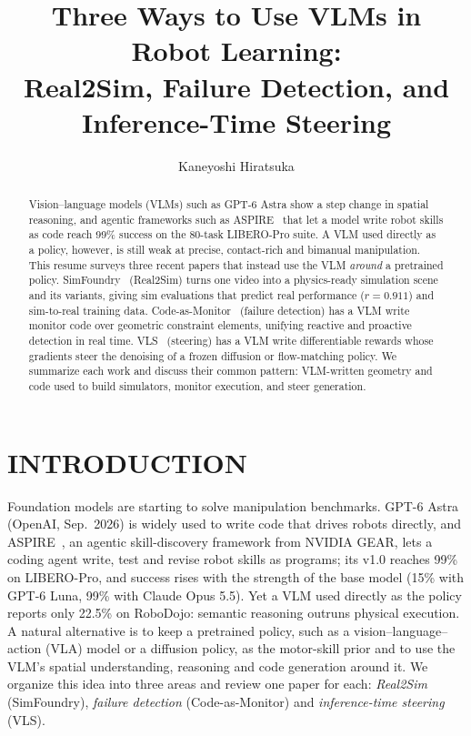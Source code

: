 \documentclass[letterpaper, 10 pt, conference]{ieeeconf}
\title{\LARGE \bf
Three Ways to Use VLMs in Robot Learning:\\
Real2Sim, Failure Detection, and Inference-Time Steering
}
\author{Kaneyoshi Hiratsuka}
\begin{document}
\maketitle
\thispagestyle{empty}
\pagestyle{empty}

\begin{abstract}
Vision--language models (VLMs) such as GPT-6 Astra show a step change in spatial reasoning, and agentic frameworks such as ASPIRE~\cite{lu2026aspire} that let a model write robot skills as code reach 99\% success on the 80-task LIBERO-Pro suite. A VLM used directly as a policy, however, is still weak at precise, contact-rich and bimanual manipulation. This resume surveys three recent papers that instead use the VLM \emph{around} a pretrained policy. SimFoundry~\cite{ranawaka2026simfoundry} (Real2Sim) turns one video into a physics-ready simulation scene and its variants, giving sim evaluations that predict real performance ($r=0.911$) and sim-to-real training data. Code-as-Monitor~\cite{zhou2025codeasmonitor} (failure detection) has a VLM write monitor code over geometric constraint elements, unifying reactive and proactive detection in real time. VLS~\cite{liu2026vls} (steering) has a VLM write differentiable rewards whose gradients steer the denoising of a frozen diffusion or flow-matching policy. We summarize each work and discuss their common pattern: VLM-written geometry and code used to build simulators, monitor execution, and steer generation.
\end{abstract}

\section{INTRODUCTION}

Foundation models are starting to solve manipulation benchmarks. GPT-6 Astra (OpenAI, Sep.~2026) is widely used to write code that drives robots directly, and ASPIRE~\cite{lu2026aspire}, an agentic skill-discovery framework from NVIDIA GEAR, lets a coding agent write, test and revise robot skills as programs; its v1.0 reaches 99\% on LIBERO-Pro, and success rises with the strength of the base model (15\% with GPT-6 Luna, 99\% with Claude Opus 5.5). Yet a VLM used directly as the policy reports only 22.5\% on RoboDojo: semantic reasoning outruns physical execution. A natural alternative is to keep a pretrained policy, such as a vision--language--action (VLA) model or a diffusion policy, as the motor-skill prior and to use the VLM's spatial understanding, reasoning and code generation around it. We organize this idea into three areas and review one paper for each: \emph{Real2Sim} (SimFoundry), \emph{failure detection} (Code-as-Monitor) and \emph{inference-time steering} (VLS).
\end{document}
